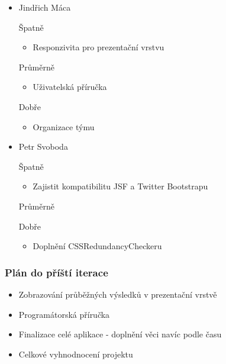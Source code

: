 \documentclass{beamer}
\begin{document}
\begin{frame}[allowframebreaks]
\begin{itemize}
    \item Jindřich Máca
      \begin{block}{Špatně} %
       \begin{itemize}
        \item Responzivita pro prezentační vrstvu
       \end{itemize}
     \end{block}
     \begin{block}{Průměrně} %
        \begin{itemize}
        \item Uživatelská příručka
       \end{itemize}
     \end{block}
     \begin{block}{Dobře} %
       \begin{itemize}
        \item Organizace týmu
       \end{itemize}
     \end{block}
   
    \item Petr Svoboda
      \begin{block}{Špatně} %
       \begin{itemize}
        \item Zajistit kompatibilitu JSF a Twitter Bootstrapu
       \end{itemize}
     \end{block}
     \begin{block}{Průměrně} %
        \begin{itemize}
       \end{itemize}
     \end{block}
     \begin{block}{Dobře} %
       \begin{itemize}
        \item Doplnění CSSRedundancyCheckeru
       \end{itemize}
     \end{block}
   \end{itemize}
\end{frame}

\begin{frame}[allowframebreaks]\frametitle{Plán do příští iterace}
  \begin{itemize}
    \item Zobrazování průběžných výsledků v prezentační vrstvě
		\item Programátorská příručka
		\item Finalizace celé aplikace - doplnění věci navíc podle času
		\item Celkové vyhnodnocení projektu
  \end{itemize}
\end{frame}
\end{document}
